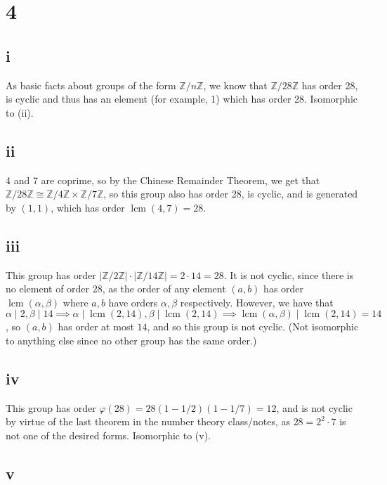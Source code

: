 \documentclass[12pt,letterpaper]{article}
\theoremstyle{definition}
\newcommand{\Z}{\mathbb{Z}}
\DeclareMathOperator{\lcm}{lcm}
\begin{document}
\section*{4}

\subsection*{i}

As basic facts about groups of the form $\Z/n\Z$, we know that $\Z/28\Z$ has order 28, is cyclic and thus has an element (for example, 1) which has order 28. Isomorphic to (ii).

\subsection*{ii}

4 and 7 are coprime, so by the Chinese Remainder Theorem, we get that $\Z/28\Z \cong \Z/4\Z \times \Z/7\Z$, so this group also has order 28, is cyclic, and is generated by $(1,1)$, which has order $\lcm(4,7) = 28$.

\subsection*{iii}

This group has order $|\Z/2\Z| \cdot |\Z/14\Z| = 2 \cdot 14 = 28$. It is not cyclic, since there is no element of order $28$, as the order of any element $(a,b)$ has order $\lcm(\alpha, \beta)$ where $a, b$ have orders $\alpha, \beta$ respectively. However, we have that $\alpha \mid 2, \beta \mid 14 \implies \alpha \mid \lcm(2,14), \beta \mid \lcm(2,14) \implies \lcm(\alpha, \beta) \mid \lcm(2, 14) = 14$, so $(a,b)$ has order at most $14$, and so this group is not cyclic. (Not isomorphic to anything else since no other group has the same order.)

\subsection*{iv}

This group has order $\varphi(28) = 28(1 - 1/2)(1-1/7) = 12$, and is not cyclic by virtue of the last theorem in the number theory class/notes, as $28 = 2^{2} \cdot 7$ is not one of the desired forms. Isomorphic to (v).

\subsection*{v}
\end{document}
